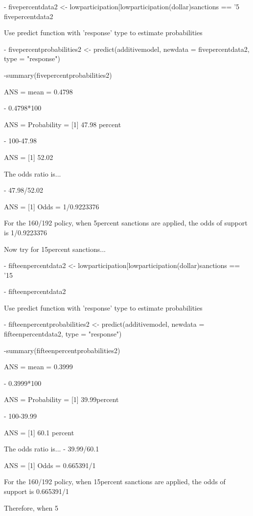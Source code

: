 \documentclass[12pt,letterpaper]{article}
\begin{document}
\begin{enumerate}
\begin{enumerate}
	- fivepercentdata2 <- lowparticipation[lowparticipation(dollar)sanctions == '5%
	fivepercentdata2

Use predict function with 'response' type to estimate probabilities

	- fivepercentprobabilities2 <- predict(additivemodel, newdata = fivepercentdata2, type = "response")
	
	-summary(fivepercentprobabilities2) 
	
ANS = mean = 0.4798

	- 0.4798*100 
	
ANS = Probability = [1] 47.98 percent

	- 100-47.98 
	
ANS = [1] 52.02

The odds ratio is...

	- 47.98/52.02 
	
ANS = [1] Odds = 1/0.9223376

For the 160/192 policy, when 5percent sanctions are applied, the odds of support is 1/0.9223376
	
	\vspace{1cm}
	
Now try for 15percent sanctions...

	- fifteenpercentdata2 <- lowparticipation[lowparticipation(dollar)sanctions == '15%
	
	- fifteenpercentdata2

 Use predict function with 'response' type to estimate probabilities

	- fifteenpercentprobabilities2 <- predict(additivemodel, newdata = fifteenpercentdata2, type = "response")
	
	-summary(fifteenpercentprobabilities2)
	
ANS = mean = 0.3999
	
	- 0.3999*100 

ANS = Probability = [1] 39.99percent

	- 100-39.99 

ANS = [1] 60.1 percent


The odds ratio is...
	- 39.99/60.1
	
	ANS = [1] Odds = 0.665391/1 

For the 160/192 policy, when 15percent sanctions are applied, the odds of support is 0.665391/1 
	
	\vspace{1cm}
	
Therefore, when 5%


\end{enumerate}
\end{enumerate}
\end{document}
